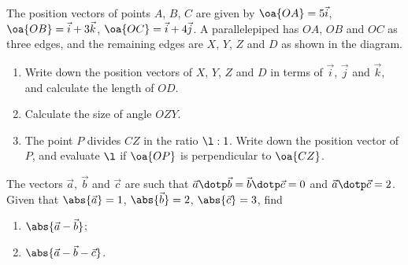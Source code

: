 \begin{problem}
    The position vectors of points $A$, $B$, $C$ are given by $\oa{OA} = 5\vec i$, $\oa{OB} = \vec i + 3\vec k$, $\oa{OC} = \vec i + 4\vec j$. A parallelepiped has $OA$, $OB$ and $OC$ as three edges, and the remaining edges are $X$, $Y$, $Z$ and $D$ as shown in the diagram.

    \begin{center}
    \end{center}

    \begin{enumerate}
        \item Write down the position vectors of $X$, $Y$, $Z$ and $D$ in terms of $\vec i$, $\vec j$ and $\vec k$, and calculate the length of $OD$.
        \item Calculate the size of angle $OZY$.
        \item The point $P$ divides $CZ$ in the ratio $\l : 1$. Write down the position vector of $P$, and evaluate $\l$ if $\oa{OP}$ is perpendicular to $\oa{CZ}$.
    \end{enumerate}
\end{problem}

\begin{problem}
    The vectors $\vec a$, $\vec b$ and $\vec c$ are such that $\vec a \dotp \vec b = \vec b \dotp \vec c = 0$ and $\vec a \dotp \vec c = 2$. Given that $\abs{\vec a} = 1$, $\abs{\vec b} = 2$, $\abs{\vec c} = 3$, find
    \begin{enumerate}
        \item $\abs{\vec a - \vec b}$;
        \item $\abs{\vec a - \vec b - \vec c}$.
    \end{enumerate}
\end{problem}

